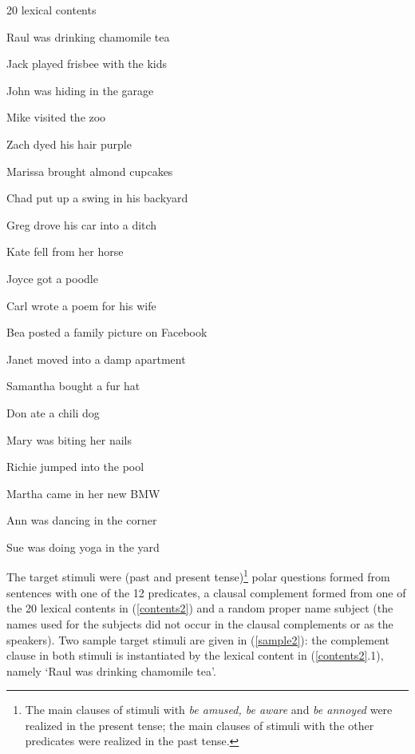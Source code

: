 \documentclass[11pt,fleqn]{article}
\newcommand{\6}{\mbox{$[\hspace*{-.6mm}[$}}
\newcommand{\9}{\mbox{$]\hspace*{-.6mm}]$}}
\begin{document}
\begin{exe}
\ex\label{contents2} 20 lexical contents

\begin{enumerate}[itemsep=-.5mm]

\begin{multicols}{2}
\item Raul was drinking chamomile tea
\item Jack played frisbee with the kids
\item John was hiding in the garage
\item Mike visited the zoo
\item Zach dyed his hair purple
\item Marissa brought almond cupcakes
\item Chad put up a swing in his backyard
\item Greg drove his car into a ditch
\item Kate fell from her horse
\item Joyce got a poodle 
\columnbreak
\item Carl wrote a poem for his wife
\item Bea posted a family picture on Facebook
\item Janet moved into a damp apartment
\item Samantha bought a fur hat
\item Don ate a chili dog
\item Mary was biting her nails
\item Richie jumped into the pool
\item Martha came in her new BMW
\item Ann was dancing in the corner
\item Sue was doing yoga in the yard
\end{multicols}
\end{enumerate}

\end{exe}

The target stimuli were (past and present tense)\footnote{The main clauses of stimuli with {\em be amused, be aware} and {\em be annoyed} were realized in the present tense; the main clauses of stimuli with the other predicates were realized in the past tense.} polar questions formed from sentences with one of the 12 predicates, a clausal complement formed from one of the 20 lexical contents in  (\ref{contents2}) and a random proper name subject (the names used for the subjects did not occur in the clausal complements or as the speakers). Two sample target stimuli are given in (\ref{sample2}): the complement clause in both stimuli is instantiated by the lexical content in (\ref{contents2}.1), namely `Raul was drinking chamomile tea'.
\end{document}
